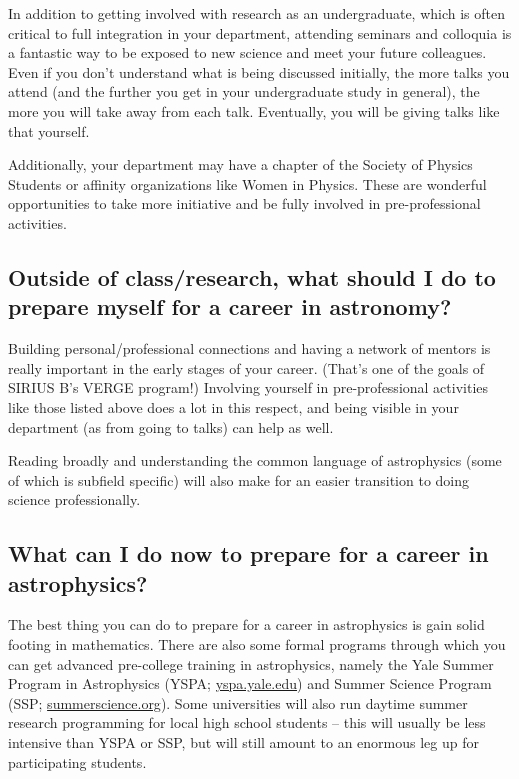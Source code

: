 In addition to getting involved with research as an undergraduate, which is often critical to full integration in your department, attending seminars and colloquia is a fantastic way to be exposed to new science and meet your future colleagues. Even if you don't understand what is being discussed initially, the more talks you attend (and the further you get in your undergraduate study in general), the more you will take away from each talk. Eventually, you will be giving talks like that yourself.

Additionally, your department may have a chapter of the Society of Physics Students or affinity organizations like Women in Physics. These are wonderful opportunities to take more initiative and be fully involved in pre-professional activities.

\vspace{-2cm}


\subsection{Outside of class/research, what should I do to prepare myself for a career in astronomy?}

Building personal/professional connections and having a network of mentors is really important in the early stages of your career. (That's one of the goals of SIRIUS B's VERGE program!) Involving yourself in pre-professional activities like those listed above does a lot in this respect, and being visible in your department (as from going to talks) can help as well.

Reading broadly and understanding the common language of astrophysics (some of which is subfield specific) will also make for an easier transition to doing science professionally.

\subsection{What can I do now to prepare for a career in astrophysics?}

The best thing you can do to prepare for a career in astrophysics is gain solid footing in mathematics. There are also some formal programs through which you can get advanced pre-college training in astrophysics, namely the Yale Summer Program in Astrophysics (YSPA; \href{https://yspa.yale.edu}{yspa.yale.edu}) and Summer Science Program (SSP; \href{https://summerscience.org}{summerscience.org}). Some universities will also run daytime summer research programming for local high school students -- this will usually be less intensive than YSPA or SSP, but will still amount to an enormous leg up for participating students. 

